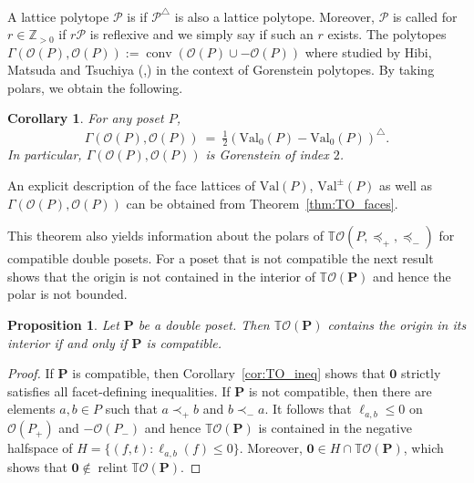 \documentclass[11pt]{amsart}
\newtheorem{cor}[thm]{Corollary}
\newtheorem{prop}[thm]{Proposition}
\theoremstyle{definition}
\begin{document}
A lattice polytope ${\mathcal{P}}$ is
{\textbf{\color{black}{reflexive}}} if ${\mathcal{P}}^{\triangle}$ is also a lattice polytope.  Moreover, ${\mathcal{P}}$
is called {\textbf{\color{black}{Gorenstein of index $r$}}} for $r \in {\mathbb{Z}}_{> 0}$ if $r{\mathcal{P}}$ is
reflexive and we simply say {\textbf{\color{black}{Gorenstein}}} if such an $r$ exists. The polytopes $\Gamma({\mathcal{O}({P})},{\mathcal{O}({P})}) := \operatorname{conv}( {\mathcal{O}({P})} \cup -{\mathcal{O}({P})} )$
where studied by Hibi, Matsuda and Tsuchiya (\cite{Hibi15-1},\cite{Hibi15-2})
in the context of Gorenstein polytopes. By
taking polars, we obtain the following.

\begin{cor}
        For any poset ${P}$,
        \[
            \Gamma({\mathcal{O}({P})},{\mathcal{O}({P})}) \ = \ \tfrac{1}{2} ({{\mathrm{Val}}_0}({P}) -
            {{\mathrm{Val}}_0}({P}))^{\triangle}.
        \]
        In particular, $\Gamma({\mathcal{O}({P})},{\mathcal{O}({P})})$ is Gorenstein of index $2$.
\end{cor}

An explicit description of the face lattices of ${\mathrm{Val}}({P})$, ${\mathrm{Val}}^\pm({P})$ as
well as $\Gamma({\mathcal{O}({P})},{\mathcal{O}({P})})$ can be obtained from
Theorem~\ref{thm:TO_faces}. 

This theorem also yields information about the
polars of ${{\mathbb{T}}{\mathcal{O}({{{P},\preceq_+,\preceq_-}})}}$ for compatible double posets. For a
poset that is not compatible the next result shows that the origin is not
contained in the interior of ${{\mathbb{T}}{\mathcal{O}({\mathbf{P}})}}$ and hence the polar is not
bounded.

\begin{prop}\label{prop:0contained}
    Let ${\mathbf{P}}$ be a double poset. Then ${{\mathbb{T}}{\mathcal{O}({\mathbf{P}})}}$ contains the origin
    in its interior if and only if ${\mathbf{P}}$ is compatible.
\end{prop}
\begin{proof}
    If ${\mathbf{P}}$ is compatible, then Corollary~\ref{cor:TO_ineq} shows that
    ${\mathbf{0}}$  strictly satisfies all facet-defining inequalities. If ${\mathbf{P}}$ is
    not compatible, then there are elements $a, b \in {P}$ such that $a \prec_+
    b$ and $b \prec_- a$. It follows that $\ell_{a,b} \le 0$ on ${\mathcal{O}({{P}_+})}$
    and $-{\mathcal{O}({{P}_-})}$ and hence ${{\mathbb{T}}{\mathcal{O}({\mathbf{P}})}}$ is contained in the negative
    halfspace of $H = \{ (f,t) : \ell_{a,b}(f) \le 0\}$. Moreover, ${\mathbf{0}} \in H
    \cap {{\mathbb{T}}{\mathcal{O}({\mathbf{P}})}}$, which shows that ${\mathbf{0}} \not\in \operatorname{relint} {{\mathbb{T}}{\mathcal{O}({\mathbf{P}})}}$.
\end{proof}
\end{document}
